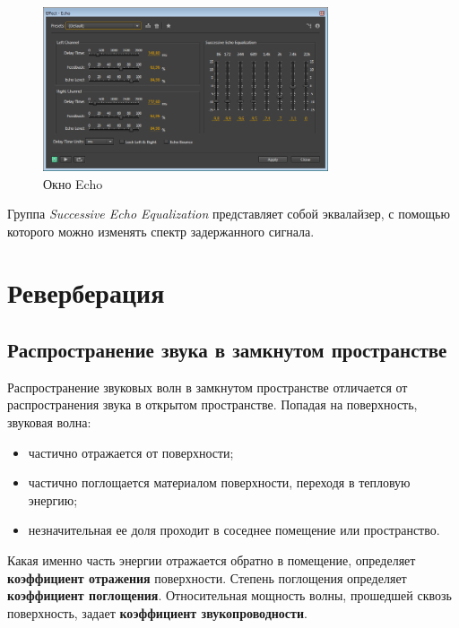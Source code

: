 \documentclass[oneside, final, 14pt]{extreport}
\begin{document}
\begin{figure}[h!]
  \centering
  \includegraphics[width=0.75\textwidth]{pic-auecho-01}
  \caption{Окно Echo}
  \label{pic-auecho-01}
\end{figure}

Группа \emph{Successive Echo Equalization} представляет собой эквалайзер, с помощью которого можно изменять спектр задержанного сигнала.

\section{Реверберация}
\subsection{Распространение звука в замкнутом пространстве}
Распространение звуковых волн в замкнутом пространстве отличается от распространения звука в открытом пространстве. Попадая на поверхность, звуковая волна:
\begin{itemize}
  \item частично отражается от поверхности;
  \item частично поглощается материалом поверхности, переходя в тепловую энергию;
  \item незначительная ее доля проходит в соседнее помещение или пространство.
\end{itemize}

Какая именно часть энергии отражается обратно в помещение, определяет \textbf{коэффициент отражения} поверхности. Степень поглощения определяет \textbf{коэффициент поглощения}. Относительная мощность волны, прошедшей сквозь поверхность, задает \textbf{коэффициент звукопроводности}.
\end{document}
